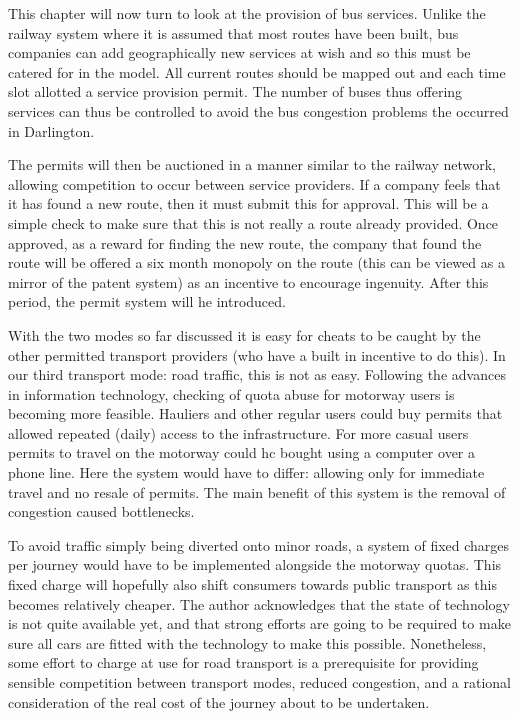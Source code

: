 This chapter will now turn to look at the provision of bus services. Unlike the railway system where it is assumed that most routes have been built, bus companies can add geographically new services at wish and so this must be catered for in the model. All current routes should be mapped out and each time slot allotted a service provision permit. The number of buses thus offering services can thus be controlled to avoid the bus congestion problems the occurred in Darlington.

The permits will then be auctioned in a manner similar to the railway network, allowing competition to occur between service providers. If a company feels that it has found a new route, then it must submit this for approval. This will be a simple check to make sure that this is not really a route already provided. Once approved, as a reward for finding the new route, the company that found the route will be offered a six month monopoly on the route (this can be viewed as a mirror of the patent system) as an incentive to encourage ingenuity. After this period, the permit system will he introduced.

With the two modes so far discussed it is easy for cheats to be caught by the other permitted transport providers (who have a built in incentive to do this). In our third transport mode: road traffic, this is not as easy. Following the advances in information technology, checking of quota abuse for motorway users is becoming more feasible. Hauliers and other regular users could buy permits that allowed repeated (daily) access to the infrastructure. For more casual users permits to travel on the motorway could hc bought using a computer over a phone line. Here the system would have to differ: allowing only for immediate travel and no resale of permits. The main benefit of this system is the removal of congestion caused bottlenecks.

To avoid traffic simply being diverted onto minor roads, a system of fixed charges per journey would have to be implemented alongside the motorway quotas. This fixed charge will hopefully also shift consumers towards public transport as this becomes relatively cheaper. The author acknowledges that the state of technology is not quite available yet, and that strong efforts are going to be required to make sure all cars are fitted with the technology to make this possible. Nonetheless, some effort to charge at use for road transport is a prerequisite for providing sensible competition between transport modes, reduced congestion, and a rational consideration of the real cost of the journey about to be undertaken.

